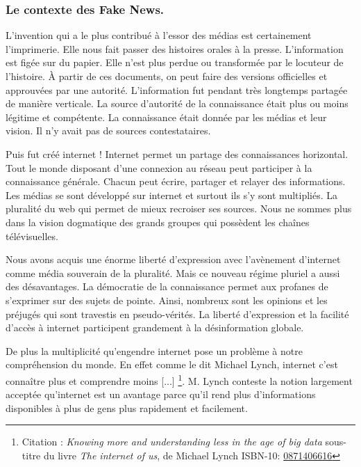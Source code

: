 \subsubsection{Le contexte des Fake News.}
L'invention qui a le plus contribué à l'essor des médias est certainement l'imprimerie.
Elle nous fait passer des histoires orales à la presse.
L'information est figée sur du papier.
Elle n'est plus perdue ou transformée par le locuteur de l'histoire.
À partir de ces documents, on peut faire des versions officielles et approuvées par une autorité.
L'information fut pendant très longtemps partagée de manière verticale.
La source d'autorité de la connaissance était plus ou moins légitime et compétente.
La connaissance était donnée par les médias et leur vision. Il n'y avait pas de sources contestataires.

Puis fut créé internet ! Internet permet un partage des connaissances horizontal.
Tout le monde disposant d'une connexion au réseau peut participer à la connaissance générale.
Chacun peut écrire, partager et relayer des informations.
Les médias se sont développé sur internet et surtout ils s'y sont multipliés.
La pluralité du web qui permet de mieux recroiser ses sources.
Nous ne sommes plus dans la vision dogmatique des grands groupes qui possèdent les chaînes télévisuelles.

Nous avons acquis une énorme liberté d'expression avec l'avènement d'internet comme média souverain de la pluralité.
Mais ce nouveau régime pluriel a aussi des désavantages.
La démocratie de la connaissance permet aux profanes de s'exprimer sur des sujets de pointe.
Ainsi, nombreux sont les opinions et les préjugés qui sont travestis en pseudo-vérités.
La liberté d'expression et la facilité d'accès à internet participent grandement à la désinformation globale.

De plus la multiplicité qu'engendre internet pose un problème à notre compréhension du monde.
En effet comme le dit Michael Lynch, internet c'est \og connaître plus et comprendre moins [...]\fg
\footnote{Citation : \textit{Knowing more and understanding less in the age of big data} sous-titre du livre \textit{The internet of us}, de Michael Lynch ISBN-10: \href{https://www.kirkusreviews.com/book-reviews/michael-patrick-lynch/the-internet-of-us/}{0871406616}}.
M. Lynch conteste la notion largement acceptée qu'internet est un avantage parce qu'il rend plus d'informations disponibles à plus de gens plus rapidement et facilement.
